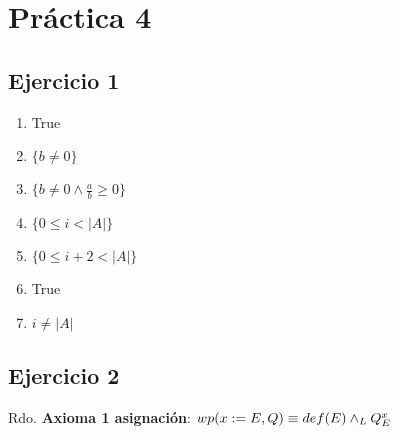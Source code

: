 
\usepackage{caratula}
\usepackage{enumerate}
\usepackage{hyperref}
\usepackage{graphicx}
\usepackage{amsfonts}
\usepackage{enumitem}

\decimalpoint
\hypersetup{colorlinks=true, linkcolor=black, urlcolor=blue}
\setlength{\parindent}{0em}
\setlength{\parskip}{0.5em}
\setcounter{tocdepth}{2} %
\setcounter{section}{3} %
\renewcommand{\thesubsubsection}{\thesubsection.\Alph{subsubsection}}
\graphicspath{ {images/} }





\maketitle
\newpage

\tableofcontents
\newpage


\section{Práctica 4}

\subsection{Ejercicio 1}
\begin{enumerate}
    \item True
    \item $ \{ b \neq 0 \} $
    \item $ \{ b \neq 0  \wedge \frac{a}{b} \geq 0 \} $
    \item $ \{ 0 \leq i < |A| \} $
    \item $ \{ 0 \leq i + 2 < |A| \} $
    \item True
    \item $ i \neq |A| $
\end{enumerate}

\subsection{Ejercicio 2}

Rdo. \textbf{Axioma 1 asignación}: $ wp(x:= E, Q) \equiv def(E) \land _L Q^x_E$

